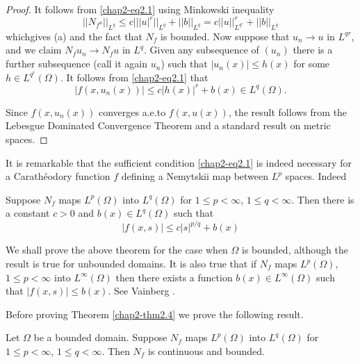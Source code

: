 \begin{proof}
It follows from \eqref{chap2-eq2.1} using Minkowski inequality
\begin{equation*}
||N_{f^{u}}||_{L^{q}}\leq
c|||u|^{r}||_{L^{q}}+||b||_{L^{q}}=c||u||^{r}_{L^{q^{r}}}+||b||_{L^{q}}\tag{2.2}\label{chap2-eq2.2} 
\end{equation*}
which\pageoriginale gives (a) and the fact that $N_{f}$ is
bounded. Now suppose that $u_{n}\to u$ in $L^{qr}$, and we claim
$N_{f}u_{n}\to N_{f}u$ in $L^{q}$. Given any subsequence of $(u_{n})$
there is a further subsequence (call it again $u_{n}$) such that
$|u_{n}(x)|\leq h(x)$ for some $h\in L^{q^{r}}(\Omega)$. It follows
from \eqref{chap2-eq2.1} that
$$
|f(x,u_{n}(x))|\leq c|h(x)|^{r}+b(x)\in L^{q}(\Omega).
$$

Since $f(x,u_{n}(x))$ converges a.e.\@ to $f(x,u(x))$, the result
follows from the Lebesgue Dominated Convergence Theorem and a standard
result on metric spaces.
\end{proof}

It is remarkable that the sufficient condition \eqref{chap2-eq2.1} is
indeed necessary for a Carath\'eodory function $f$ defining a
Nemytskii map between $L^{p}$ spaces. Indeed

\begin{theorem}\label{chap2-thm2.4}
Suppose $N_{f}$ maps $L^{p}(\Omega)$ into $L^{q}(\Omega)$ for $1\leq
p<\infty$, $1\leq q<\infty$. Then there is a constant $c>0$ and
$b(x)\in L^{q}(\Omega)$ such that
\begin{equation*}
|f(x,s)|\leq c|s|^{p/q}+b(x)\tag{2.3}\label{chap2-eq2.3}
\end{equation*}
\end{theorem}

\begin{remark*}
We shall prove the above theorem for the case when $\Omega$ is
bounded, although the result is true for unbounded domains. It is also
true that if $N_{f}$ maps $L^{p}(\Omega)$, $1\leq p<\infty$ into
$L^{\infty}(\Omega)$ then there exists a function $b(x)\in
L^{\infty}(\Omega)$ such that $|f(x,s)|\leq b(x)$. See Vainberg
\cite{key78}. 
\end{remark*}

Before proving Theorem \ref{chap2-thm2.4} we prove the following
result.

\begin{theorem}\label{chap2-thm2.5}
Let $\Omega$ be a bounded domain. Suppose $N_{f}$ maps $L^{p}(\Omega)$
into $L^{q}(\Omega)$ for $1\leq p<\infty$, $1\leq q<\infty$. Then
$N_{f}$ is continuous and bounded. 
\end{theorem}

